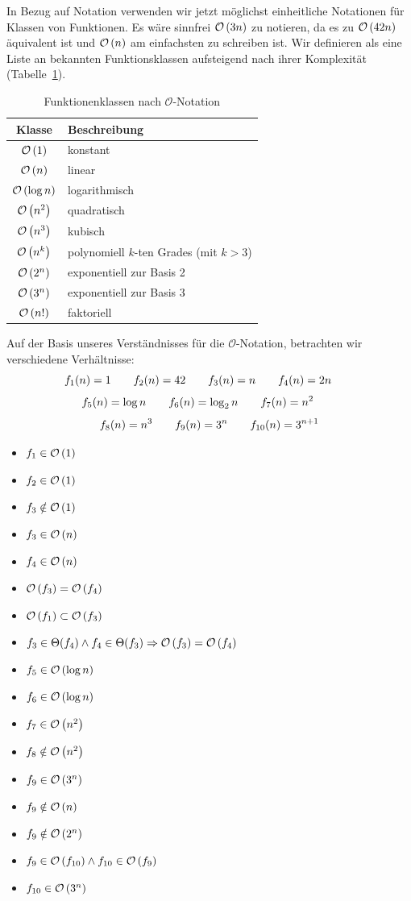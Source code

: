 In Bezug auf Notation verwenden wir jetzt möglichst einheitliche Notationen für Klassen von Funktionen. Es wäre sinnfrei $\mathcal{O}\left(3n\right)$ zu notieren, da es zu $\mathcal{O}\left(42n\right)$ äquivalent ist und $\mathcal{O}\left(n\right)$ am einfachsten zu schreiben ist. Wir definieren als eine Liste an bekannten Funktionsklassen aufsteigend nach ihrer Komplexität (Tabelle~\ref{tab:classes}).
\begin{table}[ht]
 \begin{center}
  \begin{tabular}{cl}
   Klasse & Beschreibung \\
  \hline
   $\mathcal{O}\left(1\right)$ & konstant \\
   $\mathcal{O}\left(n\right)$ & linear \\
   $\mathcal{O}\left(\log{n}\right)$ & logarithmisch \\
   $\mathcal{O}\left(n^2\right)$ & quadratisch \\
   $\mathcal{O}\left(n^3\right)$ & kubisch \\
   $\mathcal{O}\left(n^k\right)$ & polynomiell $k$-ten Grades (mit $k>3$) \\
   $\mathcal{O}\left(2^n\right)$ & exponentiell zur Basis 2 \\
   $\mathcal{O}\left(3^n\right)$ & exponentiell zur Basis 3 \\
   $\mathcal{O}\left(n!\right)$ & faktoriell \\
  \end{tabular}
  \caption{Funktionenklassen nach $\mathcal{O}$-Notation}
  \label{tab:classes}
 \end{center}
\end{table}

Auf der Basis unseres Verständnisses für die $\mathcal{O}$-Notation, betrachten wir verschiedene Verhältnisse:%
\[
   f_1(n) = 1 \hspace{20pt}
   f_2(n) = 42 \hspace{20pt}
   f_3(n) = n \hspace{20pt}
   f_4(n) = 2n \hspace{20pt}
\] \[
   f_5(n) = \log{n} \hspace{20pt}
   f_6(n) = \log_2{n} \hspace{20pt}
   f_7(n) = n^2 \hspace{20pt}
\] \[
   f_8(n) = n^3 \hspace{20pt}
   f_9(n) = 3^n \hspace{20pt}
   f_{10}(n) = 3^{n+1}
\]
\begin{itemize}
  \item $f_1 \in \mathcal{O}\left(1\right)$
  \item $f_2 \in \mathcal{O}\left(1\right)$
  \item $f_3 \notin \mathcal{O}\left(1\right)$
  \item $f_3 \in \mathcal{O}\left(n\right)$
  \item $f_4 \in \mathcal{O}\left(n\right)$
  \item $\mathcal{O}\left(f_3\right) = \mathcal{O}\left(f_4\right)$
  \item $\mathcal{O}\left(f_1\right) \subset \mathcal{O}\left(f_3\right)$
  \item $f_3 \in \Theta(f_4) \land f_4 \in \Theta(f_3) \Rightarrow \mathcal{O}\left(f_3\right) = \mathcal{O}\left(f_4\right)$
  \item $f_5 \in \mathcal{O}\left(\log{n}\right)$
  \item $f_6 \in \mathcal{O}\left(\log{n}\right)$
  \item $f_7 \in \mathcal{O}\left(n^2\right)$
  \item $f_8 \notin \mathcal{O}\left(n^2\right)$
  \item $f_9 \in \mathcal{O}\left(3^n\right)$
  \item $f_9 \notin \mathcal{O}\left(n\right)$
  \item $f_9 \notin \mathcal{O}\left(2^n\right)$
  \item $f_9 \in \mathcal{O}\left(f_{10}\right) \land f_{10} \in \mathcal{O}\left(f_9\right)$
  \item $f_{10} \in \mathcal{O}\left(3^n\right)$
\end{itemize}

